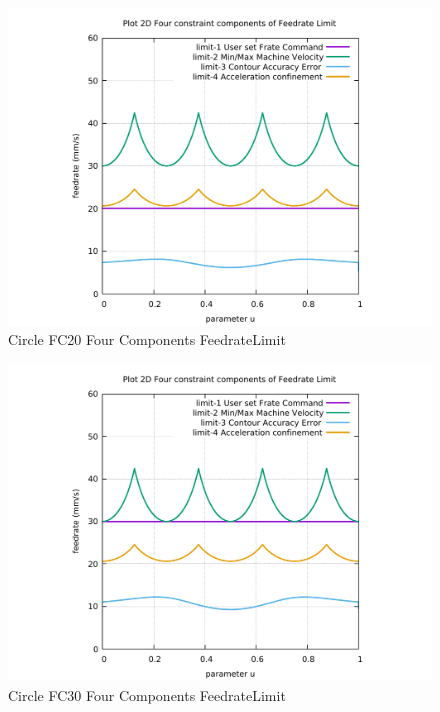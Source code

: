 \begin{figure}
	\caption     {Circle FC20 Four Components FeedrateLimit}
	\label{32-img-Circle-FC20-Four-Components-FeedrateLimit.pdf}
	\includegraphics[width=1.00\textwidth]{Chap4/appendix/app-Circle/plots/32-img-Circle-FC20-Four-Components-FeedrateLimit.pdf}
\end{figure}


\clearpage
\pagebreak

\begin{figure}
	\caption     {Circle FC30 Four Components FeedrateLimit}
	\label{33-img-Circle-FC30-Four-Components-FeedrateLimit.pdf}
	\includegraphics[width=1.00\textwidth]{Chap4/appendix/app-Circle/plots/33-img-Circle-FC30-Four-Components-FeedrateLimit.pdf}
\end{figure}


